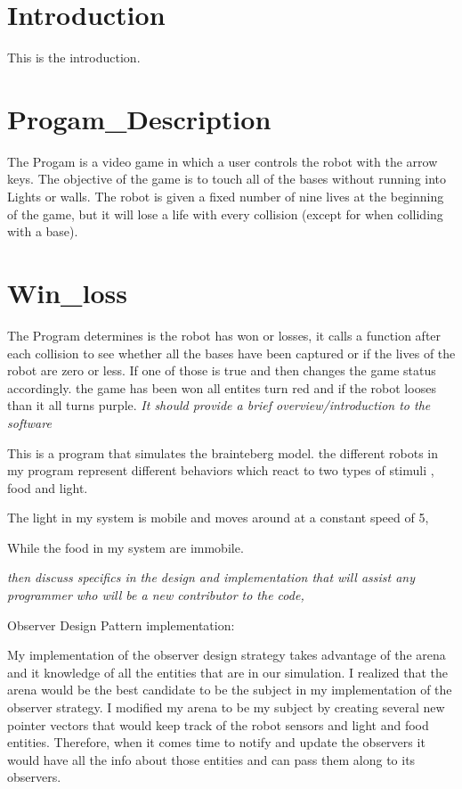 \hypertarget{index_intro_sec}{}\section{Introduction}\label{index_intro_sec}
This is the introduction.\hypertarget{index_Progam_Description}{}\section{Progam\+\_\+\+Description}\label{index_Progam_Description}
The Progam is a video game in which a user controls the robot with the arrow keys. The objective of the game is to touch all of the bases without running into Lights or walls. The robot is given a fixed number of nine lives at the beginning of the game, but it will lose a life with every collision (except for when colliding with a base).\hypertarget{index_Win_loss}{}\section{Win\+\_\+loss}\label{index_Win_loss}
The Program determines is the robot has won or losses, it calls a function after each collision to see whether all the bases have been captured or if the lives of the robot are zero or less. If one of those is true and then changes the game status accordingly. the game has been won all entites turn red and if the robot looses than it all turns purple. {\itshape It should provide a brief overview/introduction to the software}

This is a program that simulates the brainteberg model. the different robots in my program represent different behaviors which react to two types of stimuli , food and light.

The light in my system is mobile and moves around at a constant speed of 5,

While the food in my system are immobile.

{\itshape then discuss specifics in the design and implementation that will assist any programmer who will be a new contributor to the code,}

Observer Design Pattern implementation\+:

My implementation of the observer design strategy takes advantage of the arena and it knowledge of all the entities that are in our simulation. I realized that the arena would be the best candidate to be the subject in my implementation of the observer strategy. I modified my arena to be my subject by creating several new pointer vectors that would keep track of the robot sensors and light and food entities. Therefore, when it comes time to notify and update the observers it would have all the info about those entities and can pass them along to its observers.

